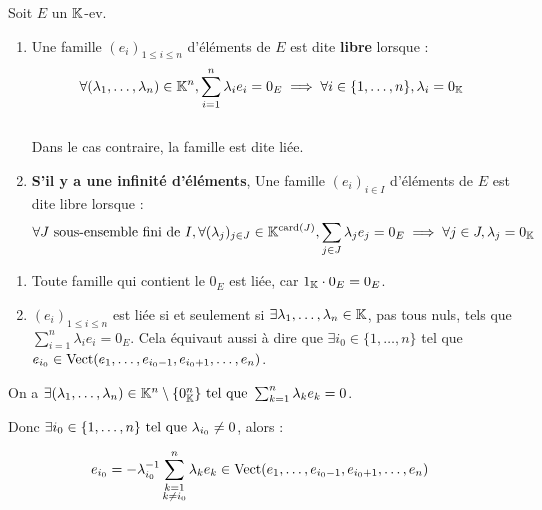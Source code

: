\documentclass[12pt, a4paper]{report}
\begin{document}
\begin{definition}
    Soit $E$ un $\mathbb{K}$-ev.
    \begin{enumerate}
        \item Une famille $(e_i)_{1 \le i \le n}$ d'éléments de $E$ est dite \textbf{libre} lorsque :
        $$\forall (\lambda_1,\dots,\lambda_n) \in \mathbb{K}^n, \sum_{i=1}^n \lambda_i e_i = 0_E \implies \forall i \in \{1,\dots,n\}, \lambda_i = 0_{\mathbb{K}}$$
        \\Dans le cas contraire, la famille est dite liée.
        \item \textbf{S'il y a une infinité d'éléments}, Une famille $(e_i)_{i \in I}$ d'éléments de $E$ est dite libre lorsque :
        $$\forall J \text{ sous-ensemble fini de } I, \forall (\lambda_j)_{j \in J} \in \mathbb{K}^{\mathrm{card}\left(J\right)}, \sum_{j \in J} \lambda_j e_j = 0_E \implies \forall j \in J, \lambda_j = 0_{\mathbb{K}}$$
    \end{enumerate}
\end{definition}

\begin{remark}
    \begin{enumerate}
        \item Toute famille qui contient le $0_E$ est liée, car $1_{\mathbb{K}} \cdot 0_E = 0_E$.
        \item $(e_i)_{1 \le i \le n}$ est liée si et seulement si $\exists \lambda_1,\dots,\lambda_n \in \mathbb{K}$, pas tous nuls, tels que $\sum_{i=1}^n \lambda_i e_i = 0_E$. Cela équivaut aussi à dire que $\exists i_0 \in \{1,\dots,n\}$ tel que $e_{i_0} \in \mathrm{Vect}(e_1,\dots,e_{i_0-1}, e_{i_0+1},\dots,e_n)$.
    \end{enumerate}
\end{remark}

\begin{consequence}
    On a $\exists (\lambda_1,\dots,\lambda_n) \in \mathbb{K}^n\setminus\{0_{\mathbb{K}}^n\} \text{ tel que } \sum_{k=1}^n \lambda_k e_k = 0$.

    Donc $\exists i_0 \in \{1,\dots,n\} \text{ tel que } \lambda_{i_0} \neq 0$, alors :
    
    $$e_{i_0} = -\lambda_{i_0}^{-1} \sum_{\substack{k=1\\k\neq i_0}}^n \lambda_k e_k \in \mathrm{Vect}(e_1,\dots,e_{i_0-1}, e_{i_0+1},\dots,e_n)$$

\end{consequence}
\end{document}
